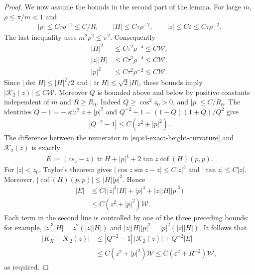 \documentclass[a4paper,11pt,oneside,reqno]{amsart}
\numberwithin{equation}{section}
\theoremstyle{definition}
\begin{document}
\begin{proof}
    We now assume the bounds in the second part of the
    lemma. For large $m$, $\rho\leq\pi/m<1$ and
    \begin{align*}
        |p|\leq C\tau\rho^{-1}\leq C/R,\qquad
        |H|\leq C\tau\rho^{-2},\qquad
        |z|\leq C\varepsilon\leq C\tau\rho^{-2}.
    \end{align*}
    The last inequality uses $m^2\rho^2\leq\pi^2$.
    Consequently
    \begin{align*}
        |H|^2&\leq C\tau^2\rho^{-4}\leq C\mathcal W,\\
        |z||H|&\leq C\tau^2\rho^{-4}\leq C\mathcal W,\\
        |p|^2&\leq C\tau^2\rho^{-2}\leq C\mathcal W.
    \end{align*}
    Since $|\det H|\leq|H|^2/2$ and
    $|\operatorname{tr}H|\leq\sqrt2|H|$, these bounds imply
    $|\mathcal K_2(z)|\leq C\mathcal W$.
    Moreover $Q$ is bounded above and below by positive
    constants independent of $m$ and $R\geq R_0$. Indeed
    $Q\geq\cos^2z_0>0$, and $|p|\leq C/R_0$.
    The identities $Q-1=-\sin^2z+|p|^2$ and
    $Q^{-2}-1=(1-Q)(1+Q)/Q^2$ give
    \begin{align*}
        |Q^{-2}-1|\leq C(z^2+|p|^2).
    \end{align*}
    The difference between the numerator in
    \eqref{eq:s4-exact-height-curvature} and
    $\mathcal K_2(z)$ is exactly
    \begin{align*}
        E:=(c s_z-z)\operatorname{tr}H+|p|^4
        +2\tan z\operatorname{cof}(H)(p,p).
    \end{align*}
    For $|z|<z_0$, Taylor's theorem gives
    $|\cos z\sin z-z|\leq C|z|^3$ and
    $|\tan z|\leq C|z|$. Moreover,
    $|\operatorname{cof}(H)(p,p)|\leq|H||p|^2$.
    Hence
    \begin{align*}
        |E|&\leq C\bigl(|z|^3|H|+|p|^4
              +|z||H||p|^2\bigr)\\
        &\leq C(z^2+|p|^2)\mathcal W.
    \end{align*}
    Each term in the second line is controlled by one of
    the three preceding bounds: for example,
    $|z|^3|H|=z^2(|z||H|)$ and
    $|z||H||p|^2=|p|^2(|z||H|)$.
    It follows that
    \begin{align*}
        |K_X-\mathcal K_2(z)|
        &\leq |Q^{-2}-1|\,|\mathcal K_2(z)|+Q^{-2}|E|\\
        &\leq C(z^2+|p|^2)\mathcal W
        \leq C(\varepsilon^2+R^{-2})\mathcal W,
    \end{align*}
    as required.
\end{proof}
\end{document}
